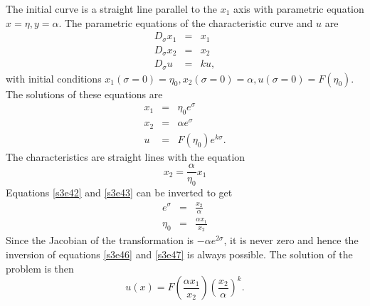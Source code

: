\documentclass{article}
\theoremstyle{plain}
\numberwithin{thm}{section}
\theoremstyle{plain}
\numberwithin{prop}{section}
\theoremstyle{definition}
\numberwithin{defn}{section}
\theoremstyle{remark}
\numberwithin{equation}{section}
\begin{document}
\begin{enumerate}
The initial curve is a straight line parallel to the $x_1$ axis with parametric equation $x = \eta, y = 
\alpha$. The parametric equations of the characteristic curve and $u$ are
\begin{eqnarray}
D_\sigma x_1 &=& x_1 \label{s3e39} \\
D_\sigma x_2 &=& x_2 \label{s3e40} \\
D_\sigma u &=& ku \label{s3e41},
\end{eqnarray}
with initial conditions $x_1(\sigma = 0) = \eta_0, x_2(\sigma = 0) = \alpha, u(\sigma = 0) = 
F(\eta_0)$. The solutions of these equations are
\begin{eqnarray}
x_1 &=& \eta_0 e^\sigma \label{s3e42} \\
x_2 &=& \alpha e^\sigma \label{s3e43} \\
u &=& F(\eta_0)e^{k\sigma}. \label{s3e44}
\end{eqnarray}
The characteristics are straight lines with the equation 
\begin{equation}\label{s3e45}
x_2 = \frac{\alpha}{\eta_0}x_1
\end{equation}
Equations \eqref{s3e42} and \eqref{s3e43} can be inverted to get
\begin{eqnarray}
e^\sigma &=& \frac{x_2}{\alpha} \label{s3e46} \\
\eta_0 &=& \frac{\alpha x_1}{x_2} \label{s3e47}
\end{eqnarray}
Since the Jacobian of the transformation is $-\alpha e^{2\sigma}$, it is never zero and hence the
inversion of equations \eqref{s3e46} and \eqref{s3e47} is always possible. The solution of the problem
is then
\begin{equation}\label{s3e48}
u(x) = F\left(\frac{\alpha x_1}{x_2}\right)\left(\frac{x_2}{\alpha}\right)^k.
\end{equation}


\end{enumerate}
\end{document}

